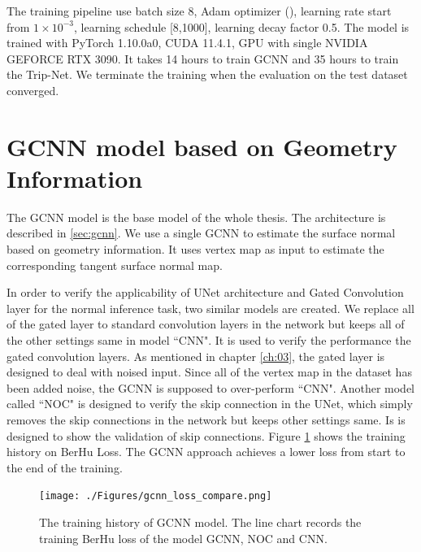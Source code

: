 \documentclass[border=15pt, multi, tikz]{article}
\begin{document}
The training pipeline use batch size $ 8 $,  Adam optimizer (\cite{adam}), learning rate start from  $ 1\times10^{-3} $, learning schedule [8,1000], learning decay factor 0.5. The model is trained with PyTorch 1.10.0a0, CUDA 11.4.1, GPU with single NVIDIA GEFORCE RTX 3090. It takes 14 hours to train GCNN and 35 hours to train the Trip-Net. We terminate the training when the evaluation on the test dataset converged.


\section{GCNN model based on Geometry Information}
The GCNN model is the base model of the whole thesis. The architecture is described in \ref{sec:gcnn}. We use a single GCNN to estimate the surface normal based on geometry information. It uses vertex map as input to estimate the corresponding tangent surface normal map. 

In order to verify the applicability of UNet architecture and Gated Convolution layer for the normal inference task, two similar models are created. 
We replace all of the gated layer to standard convolution layers in the network but keeps all of the other settings same in model ``CNN". It is used to verify the performance the gated convolution layers. As mentioned in chapter \ref{ch:03}, the gated layer is designed to deal with noised input. Since all of the vertex map in the dataset has been added noise, the GCNN is supposed to over-perform ``CNN". Another model called ``NOC" is designed to verify the skip connection in the UNet, which simply removes the skip connections in the network but keeps other settings same. Is is designed to show the validation of skip connections. Figure \ref{fig:gcnn-training-history} shows the training history on BerHu Loss. The GCNN approach achieves a lower loss from start to the end of the training.

\begin{figure}[th]
	\centering
	\texttt{[image: ./Figures/gcnn\_loss\_compare.png]}
	\caption{The training history of GCNN model. The line chart records the training BerHu loss of the model GCNN, NOC and CNN.}
	\label{fig:gcnn-training-history}
\end{figure}
\end{document}
